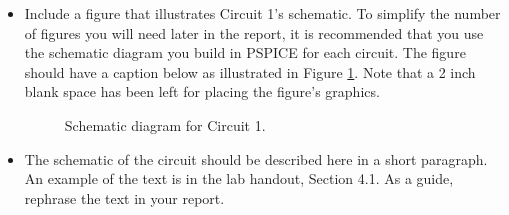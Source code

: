 \documentclass[11pt]{article}
\begin{document}
\begin{itemize}
	\item Include a figure that illustrates  Circuit 1's schematic.  To simplify the number of figures you will need later in the report, it is recommended that you use the schematic diagram you build in PSPICE for each circuit.  The figure should have a caption below as illustrated in Figure \ref{Fig:Circuit Schematics}. Note that a 2 inch blank space has been left for placing the figure's graphics.
	\begin{figure}[htbp]
		\centering
		\vspace{2in}
		\caption{Schematic diagram for Circuit 1. }
		\label{Fig:Circuit Schematics}
	\end{figure}
	
	\item The schematic of the circuit should be described here in a short paragraph.  An example of the text is in the lab handout, Section 4.1.  As a guide, rephrase the text in your report. 
\end{itemize}
\end{document}
